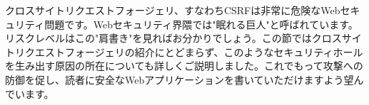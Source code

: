 クロスサイトリクエストフォージェリ、すなわちCSRFは非常に危険なWebセキュリティ問題です。Webセキュリティ界隈では"眠れる巨人"と呼ばれています。リスクレベルはこの"肩書き"を見ればお分かりでしょう。この節ではクロスサイトリクエストフォージェリの紹介にとどまらず、このようなセキュリティホールを生み出す原因の所在についても詳しくご説明しました。これでもって攻撃への防御を促し、読者に安全なWebアプリケーションを書いていただけますよう望んでいます。
